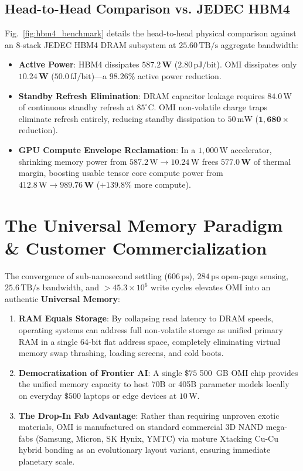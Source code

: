 \documentclass[journal]{IEEEtran}
\begin{document}
\subsection{Head-to-Head Comparison vs. JEDEC HBM4}
Fig.~\ref{fig:hbm4_benchmark} details the head-to-head physical comparison against an 8-stack JEDEC HBM4 DRAM subsystem at $25.60\,\text{TB/s}$ aggregate bandwidth:
\begin{itemize}
    \item \textbf{Active Power}: HBM4 dissipates $\mathbf{587.2\,\text{W}}$ ($2.80\,\text{pJ/bit}$). OMI dissipates only $\mathbf{10.24\,\text{W}}$ ($50.0\,\text{fJ/bit}$)---a $\mathbf{98.26\%}$ active power reduction.
    \item \textbf{Standby Refresh Elimination}: DRAM capacitor leakage requires $84.0\,\text{W}$ of continuous standby refresh at $85^\circ\text{C}$. OMI non-volatile charge traps eliminate refresh entirely, reducing standby dissipation to $50\,\text{mW}$ ($\mathbf{1,680\times}$ reduction).
    \item \textbf{GPU Compute Envelope Reclamation}: In a $1,000\,\text{W}$ accelerator, shrinking memory power from $587.2\,\text{W} \to 10.24\,\text{W}$ frees $\mathbf{577.0\,\text{W}}$ of thermal margin, boosting usable tensor core compute power from $412.8\,\text{W} \to \mathbf{989.76\,\text{W}}$ ($\mathbf{+139.8\%}$ more compute).
\end{itemize}

\section{The Universal Memory Paradigm \& Customer Commercialization}
\label{sec:universal_memory}

The convergence of sub-nanosecond settling ($606\,\text{ps}$), $284\,\text{ps}$ open-page sensing, $25.6\,\text{TB/s}$ bandwidth, and $>45.3\times 10^6$ write cycles elevates OMI into an authentic \textbf{Universal Memory}:
\begin{enumerate}
    \item \textbf{RAM Equals Storage}: By collapsing read latency to DRAM speeds, operating systems can address full non-volatile storage as unified primary RAM in a single 64-bit flat address space, completely eliminating virtual memory swap thrashing, loading screens, and cold boots.
    \item \textbf{Democratization of Frontier AI}: A single $\$75$ 500~GB OMI chip provides the unified memory capacity to host 70B or 405B parameter models locally on everyday $\$500$ laptops or edge devices at $10\,\text{W}$.
    \item \textbf{The Drop-In Fab Advantage}: Rather than requiring unproven exotic materials, OMI is manufactured on standard commercial 3D NAND mega-fabs (Samsung, Micron, SK Hynix, YMTC) via mature Xtacking Cu-Cu hybrid bonding as an evolutionary layout variant, ensuring immediate planetary scale.
\end{enumerate}
\end{document}
